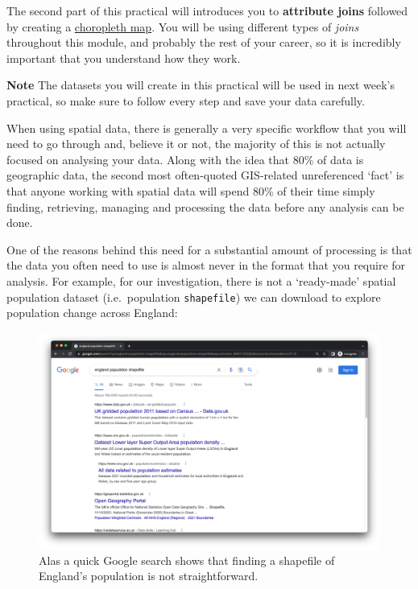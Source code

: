 \documentclass[
]{book}
\begin{document}
The second part of this practical will introduces you to \textbf{attribute joins} followed by creating a \href{https://en.wikipedia.org/wiki/Choropleth_map}{choropleth map}. You will be using different types of \emph{joins} throughout this module, and probably the rest of your career, so it is incredibly important that you understand how they work.

\textbf{Note}
The datasets you will create in this practical will be used in next week's practical, so make sure to follow every step and save your data carefully.

When using spatial data, there is generally a very specific workflow that you will need to go through and, believe it or not, the majority of this is not actually focused on analysing your data. Along with the idea that 80\% of data is geographic data, the second most often-quoted GIS-related unreferenced `fact' is that anyone working with spatial data will spend 80\% of their time simply finding, retrieving, managing and processing the data before any analysis can be done.

One of the reasons behind this need for a substantial amount of processing is that the data you often need to use is almost never in the format that you require for analysis. For example, for our investigation, there is not a `ready-made' spatial population dataset (i.e.~population \texttt{shapefile}) we can download to explore population change across England:

\begin{figure}

{\centering \includegraphics[width=0.9\linewidth]{images/w02/datasearch} 

}

\caption{Alas a quick Google search shows that finding a shapefile of England's population is not straightforward.}\label{fig:02-google-shp}
\end{figure}
\end{document}
